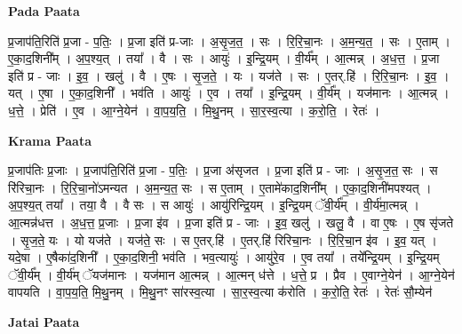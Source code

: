 \documentclass[17pt]{extarticle}
\begin{document}
\textbf{Pada Paata} \newline

प्र॒जाप॑ति॒रिति॑ प्र॒जा - प॒तिः॒ । प्र॒जा इति॑ प्र-जाः । अ॒सृ॒ज॒त॒ । सः । रि॒रि॒चा॒नः । अ॒म॒न्य॒त॒ । सः । ए॒ताम् । ए॒का॒द॒शिनी᳚म् । अ॒प॒श्य॒त् । तया᳚ । वै । सः । आयुः॑ । इ॒न्द्रि॒यम् । वी॒र्य᳚म् । आ॒त्मन्न् । अ॒ध॒त्त॒ । प्र॒जा इति॑ प्र - जाः । इ॒व॒ । खलु॑ । वै । ए॒षः । सृ॒ज॒ते॒ । यः । यज॑ते । सः । ए॒तर्.हि॑ । रि॒रि॒चा॒नः । इ॒व॒ । यत् । ए॒षा । ए॒का॒द॒शिनी᳚ । भव॑ति । आयुः॑ । ए॒व । तया᳚ । इ॒न्द्रि॒यम् । वी॒र्य᳚म् । यज॑मानः । आ॒त्मन्न् । ध॒त्ते॒ । प्रेति॑ । ए॒व । आ॒ग्ने॒येन॑ । वा॒प॒य॒ति॒ । मि॒थु॒नम् । सा॒र॒स्व॒त्या । क॒रो॒ति॒ । रेतः॑ ।  \newline


\textbf{Krama Paata} \newline

प्र॒जाप॑तिः प्र॒जाः । प्र॒जाप॑ति॒रिति॑ प्र॒जा - प॒तिः॒ । प्र॒जा अ॑सृजत । प्र॒जा इति॑ प्र - जाः । अ॒सृ॒ज॒त॒ सः । स रि॑रिचा॒नः । रि॒रि॒चा॒नो॑ऽमन्यत । अ॒म॒न्य॒त॒ सः । स ए॒ताम् । ए॒तामे॑काद॒शिनी᳚म् । ए॒का॒द॒शिनी॑मपश्यत् । अ॒प॒श्य॒त् तया᳚ । तया॒ वै । वै सः । स आयुः॑ । आयु॑रिन्द्रि॒यम् । इ॒न्द्रि॒यम् ॅवी॒र्य᳚म् । वी॒र्य॑मा॒त्मन्न् । आ॒त्मन्न॑धत्त । अ॒ध॒त्त॒ प्र॒जाः । प्र॒जा इ॑व । प्र॒जा इति॑ प्र - जाः । इ॒व॒ खलु॑ । खलु॒ वै । वा ए॒षः । ए॒ष सृ॑जते । सृ॒ज॒ते॒ यः । यो यज॑ते । यज॑ते॒ सः । स ए॒तर्.हि॑ । ए॒तर्.हि॑ रिरिचा॒नः । रि॒रि॒चा॒न इ॑व । इ॒व॒ यत् । यदे॒षा । ए॒षैका॑द॒शिनी᳚ । ए॒का॒द॒शिनी॒ भव॑ति । भव॒त्यायुः॑ । आयु॑रे॒व । ए॒व तया᳚ । तये᳚न्द्रि॒यम् । इ॒न्द्रि॒यम् ॅवी॒र्य᳚म् । वी॒र्य॑म् ॅयज॑मानः । यज॑मान आ॒त्मन्न् । आ॒त्मन् ध॑त्ते । ध॒त्ते॒ प्र । प्रैव । ए॒वाग्ने॒येन॑ । आ॒ग्ने॒येन॑ वापयति । वा॒प॒य॒ति॒ मि॒थु॒नम् । मि॒थु॒नꣳ सा॑रस्व॒त्या । सा॒र॒स्व॒त्या क॑रोति । क॒रो॒ति॒ रेतः॑ । रेतः॑ सौ॒म्येन॑ \newline

\textbf{Jatai Paata} \newline
\end{document}
